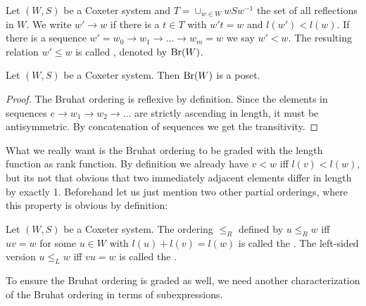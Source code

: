 \begin{defi}
	Let $(W,S)$ be a Coxeter system and $T = \cup_{w \in W} wSw^{-1}$ the set of all reflections in $W$. We write $w' \to w$ if there is a $t \in T$ with $w't = w$ and $l(w') < l(w)$. If there is a sequence $w' = w_0 \to w_1 \to \ldots \to w_m = w$ we say $w' < w$. The resulting relation $w' \leq w$ is called , denoted by $\operatorname{Br}(W)$.
\end{defi}

\begin{lemm}
	Let $(W,S)$ be a Coxeter system. Then $\operatorname{Br}(W)$ is a poset.

	\begin{proof}
		The Bruhat ordering is reflexive by definition. Since the elements in sequences $e \to w_1 \to w_2 \to \ldots$ are strictly ascending in length, it must be antisymmetric. By concatenation of sequences we get the transitivity.
	\end{proof}
\end{lemm}

What we really want is the Bruhat ordering to be graded with the length function as rank function. By definition we already have $v < w$ iff $l(v) < l(w)$, but its not that obvious that two immediately adjacent elements differ in length by exactly 1. Beforehand let us just mention two other partial orderings, where this property is obvious by definition:

\begin{defi}
	Let $(W,S)$ be a Coxeter system. The ordering $\leq_R$ defined by $u \leq_R w$ iff $uv = w$ for some $u \in W$ with $l(u) + l(v) = l(w)$ is called the . The left-sided version $u \leq_L w$ iff $vu = w$ is called the .
\end{defi}

To ensure the Bruhat ordering is graded as well, we need another characterization of the Bruhat ordering in terms of subexpressions.

